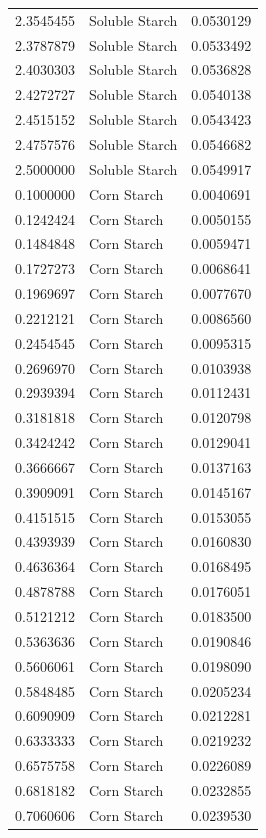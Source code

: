 \documentclass[
  12pt,
]{article}
\begin{document}
{\begin{longtable}[]{@{}rlr@{}}
2.3545455 & Soluble Starch & 0.0530129 \\
2.3787879 & Soluble Starch & 0.0533492 \\
2.4030303 & Soluble Starch & 0.0536828 \\
2.4272727 & Soluble Starch & 0.0540138 \\
2.4515152 & Soluble Starch & 0.0543423 \\
2.4757576 & Soluble Starch & 0.0546682 \\
2.5000000 & Soluble Starch & 0.0549917 \\
0.1000000 & Corn Starch & 0.0040691 \\
0.1242424 & Corn Starch & 0.0050155 \\
0.1484848 & Corn Starch & 0.0059471 \\
0.1727273 & Corn Starch & 0.0068641 \\
0.1969697 & Corn Starch & 0.0077670 \\
0.2212121 & Corn Starch & 0.0086560 \\
0.2454545 & Corn Starch & 0.0095315 \\
0.2696970 & Corn Starch & 0.0103938 \\
0.2939394 & Corn Starch & 0.0112431 \\
0.3181818 & Corn Starch & 0.0120798 \\
0.3424242 & Corn Starch & 0.0129041 \\
0.3666667 & Corn Starch & 0.0137163 \\
0.3909091 & Corn Starch & 0.0145167 \\
0.4151515 & Corn Starch & 0.0153055 \\
0.4393939 & Corn Starch & 0.0160830 \\
0.4636364 & Corn Starch & 0.0168495 \\
0.4878788 & Corn Starch & 0.0176051 \\
0.5121212 & Corn Starch & 0.0183500 \\
0.5363636 & Corn Starch & 0.0190846 \\
0.5606061 & Corn Starch & 0.0198090 \\
0.5848485 & Corn Starch & 0.0205234 \\
0.6090909 & Corn Starch & 0.0212281 \\
0.6333333 & Corn Starch & 0.0219232 \\
0.6575758 & Corn Starch & 0.0226089 \\
0.6818182 & Corn Starch & 0.0232855 \\
0.7060606 & Corn Starch & 0.0239530 \\

\end{longtable}}
\end{document}
